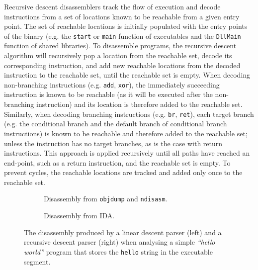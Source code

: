 Recursive descent disassemblers track the flow of execution and decode instructions from a set of locations known to be reachable from a given entry point. The set of reachable locations is initially populated with the entry points of the binary (e.g. the \texttt{start} or \texttt{main} function of executables and the \texttt{DllMain} function of shared libraries). To disassemble programs, the recursive descent algorithm will recursively pop a location from the reachable set, decode its corresponding instruction, and add new reachable locations from the decoded instruction to the reachable set, until the reachable set is empty. When decoding non-branching instructions (e.g. \texttt{add}, \texttt{xor}), the immediately succeeding instruction is known to be reachable (as it will be executed after the non-branching instruction) and its location is therefore added to the reachable set. Similarly, when decoding branching instructions (e.g. \texttt{br}, \texttt{ret}), each target branch (e.g. the conditional branch and the default branch of conditional branch instructions) is known to be reachable and therefore added to the reachable set; unless the instruction has no target branches, as is the case with return instructions. This approach is applied recursively until all paths have reached an end-point, such as a return instruction, and the reachable set is empty. To prevent cycles, the reachable locations are tracked and added only once to the reachable set.

\begin{figure}[htbp]
	\centering
	\begin{subfigure}[t]{0.49\textwidth}
		
		\caption{Disassembly from \texttt{objdump} and \texttt{ndisasm}\protect\footnotemark.}
	\end{subfigure}
	\qquad
	\begin{subfigure}[t]{0.35\textwidth}
		
		\caption{Disassembly from IDA.}
	\end{subfigure}
	\caption{The disassembly produced by a linear descent parser (left) and a recursive descent parser (right) when analysing a simple \textit{``hello world''} program that stores the \texttt{hello} string in the executable segment.}
	\label{fig:comparison_between_linear_and_recursive_descent}
\end{figure}

